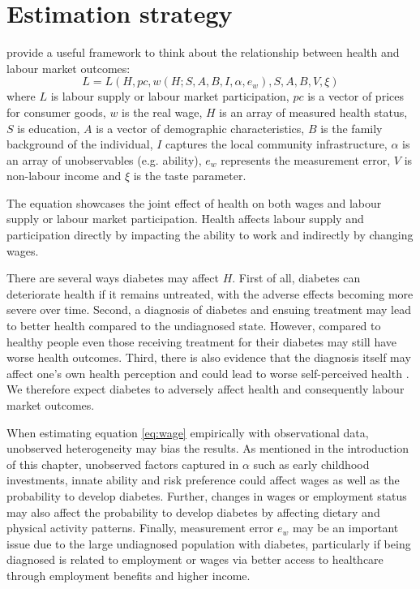 
\section{\label{sec:Estimation Strategy}Estimation strategy}
 
\textcite{Strauss1998} provide a useful framework to think about the relationship between health and labour market outcomes:
\begin{equation}
L=L(H, pc, w(H;S,A,B,I,\alpha,e_{w}), S, A, B, V, \xi) \label{eq:wage}
\end{equation}
where $L$ is labour supply or labour market participation, $pc $ is a vector of prices for consumer goods, $w$ is the real wage, $H$ is an array of measured health status, $S$ is education, $A$ is a vector of demographic characteristics, $B$ is the family background of the individual, $I$ captures the local community infrastructure, $\alpha$ is an array of unobservables (e.g. ability), $e_w$ represents the measurement error, $V$ is non-labour income and $\xi$ is the taste parameter. 

The equation showcases the joint effect of health on both wages and labour supply or labour market participation. Health affects labour supply and participation directly by impacting the ability to work and indirectly by changing wages.

There are several ways diabetes may affect $H$. First of all, diabetes can deteriorate health if it remains untreated, with the adverse effects becoming more severe over time. Second, a diagnosis of diabetes and ensuing treatment may lead to better health compared to the undiagnosed state. However, compared to healthy people even those receiving treatment for their diabetes may still have worse health outcomes. Third, there is also evidence that the diagnosis itself may affect one's own health perception and could lead to worse self-perceived health \parencite{Thoolen2006}. We therefore expect diabetes to adversely affect health and consequently labour market outcomes.

When estimating equation \ref{eq:wage} empirically with observational data, unobserved heterogeneity may bias the results. As mentioned in the introduction of this chapter, unobserved factors captured in $\alpha$ such as early childhood investments, innate ability and risk preference could affect wages as well as the probability to develop diabetes. Further, changes in wages or employment status may also affect the probability to develop diabetes by affecting dietary and physical activity patterns. Finally, measurement error $e_w$ may be an important issue due to the large undiagnosed population with diabetes, particularly if being diagnosed is related to employment or wages via better access to healthcare through employment benefits and higher income.

